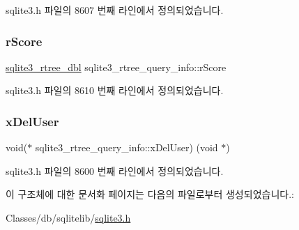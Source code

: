 sqlite3.\+h 파일의 8607 번째 라인에서 정의되었습니다.

\mbox{\label{structsqlite3__rtree__query__info_af449e4a3607573d17b3d31c67b6e1584}} 
\subsubsection{\texorpdfstring{r\+Score}{rScore}}
{\footnotesize\ttfamily \hyperlink{sqlite3_8h_ae9156ff58620c1ceae9391f1afabae1b}{sqlite3\+\_\+rtree\+\_\+dbl} sqlite3\+\_\+rtree\+\_\+query\+\_\+info\+::r\+Score}



sqlite3.\+h 파일의 8610 번째 라인에서 정의되었습니다.

\mbox{\label{structsqlite3__rtree__query__info_a23bcc6df883995d42d65449a27f45f85}} 
\subsubsection{\texorpdfstring{x\+Del\+User}{xDelUser}}
{\footnotesize\ttfamily void($\ast$ sqlite3\+\_\+rtree\+\_\+query\+\_\+info\+::x\+Del\+User) (void $\ast$)}



sqlite3.\+h 파일의 8600 번째 라인에서 정의되었습니다.



이 구조체에 대한 문서화 페이지는 다음의 파일로부터 생성되었습니다.\+:\begin{DoxyCompactItemize}
\item 
Classes/db/sqlitelib/\hyperlink{sqlite3_8h}{sqlite3.\+h}\end{DoxyCompactItemize}
